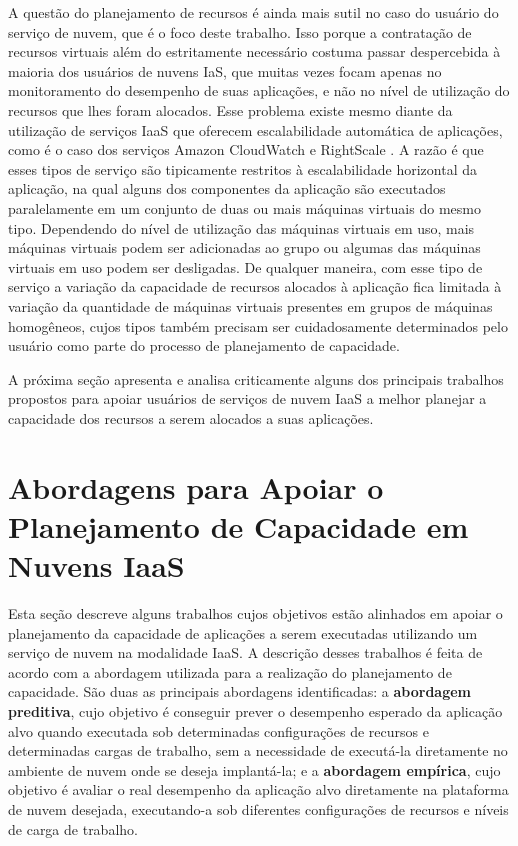 A questão do planejamento de recursos é ainda mais sutil no caso do usuário do serviço de nuvem, que é o foco deste trabalho. Isso porque a contratação de recursos virtuais além do estritamente necessário costuma passar despercebida à maioria dos usuários de nuvens IaS, que muitas vezes focam apenas no monitoramento do desempenho de suas aplicações, e não no nível de utilização do recursos que lhes foram alocados. Esse problema existe mesmo diante da utilização de serviços IaaS que oferecem escalabilidade automática de aplicações, como é o caso dos serviços Amazon CloudWatch \cite{amazon_watch} e RightScale \cite{rightscale}. A razão é que esses tipos de serviço são tipicamente restritos à escalabilidade horizontal da aplicação, na qual alguns dos componentes da aplicação são executados paralelamente em um conjunto de duas ou mais máquinas virtuais do mesmo tipo. Dependendo do nível de utilização das máquinas virtuais em uso, mais máquinas virtuais podem ser adicionadas ao grupo ou algumas das máquinas virtuais em uso podem ser desligadas. De qualquer maneira, com esse tipo de serviço a variação da capacidade de recursos alocados à aplicação fica limitada à variação da quantidade de máquinas virtuais presentes em grupos de máquinas homogêneos, cujos tipos também precisam ser cuidadosamente determinados pelo usuário como parte do processo de planejamento de capacidade. 

A próxima seção apresenta e analisa criticamente alguns dos principais trabalhos propostos para apoiar usuários de serviços de nuvem IaaS a melhor planejar a capacidade dos recursos a serem alocados a suas aplicações.

\section{Abordagens para Apoiar o Planejamento de Capacidade em Nuvens IaaS}

Esta seção descreve alguns trabalhos cujos objetivos estão alinhados em apoiar o planejamento da capacidade de aplicações a serem executadas utilizando um serviço de nuvem na modalidade IaaS. A descrição desses trabalhos é feita de acordo com a abordagem utilizada para a realização do planejamento de capacidade. São duas as principais abordagens identificadas: a \textbf{abordagem preditiva}, cujo objetivo é conseguir prever o desempenho esperado da aplicação alvo quando executada sob determinadas configurações de recursos e determinadas cargas de trabalho, sem a necessidade de executá-la diretamente no ambiente de nuvem onde se deseja implantá-la; e a \textbf{abordagem empírica}, cujo objetivo é avaliar o real desempenho da aplicação alvo diretamente na plataforma de nuvem desejada, executando-a sob diferentes configurações de recursos e níveis de carga de trabalho. 

